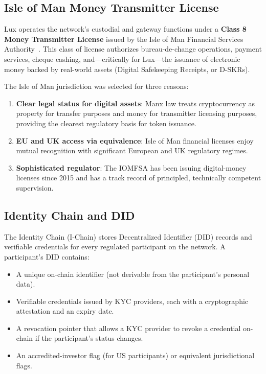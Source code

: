 \documentclass[11pt,a4paper]{article}
\begin{document}
\subsection{Isle of Man Money Transmitter License}

Lux operates the network's custodial and gateway functions under a
\textbf{Class 8 Money Transmitter License} issued by the Isle of Man
Financial Services Authority~\cite{iomfsa,cdax}. This class of
license authorizes bureau-de-change operations, payment services,
cheque cashing, and---critically for Lux---the issuance of
electronic money backed by real-world assets (Digital Safekeeping
Receipts, or D-SKRs).

The Isle of Man jurisdiction was selected for three reasons:

\begin{enumerate}[nosep]
  \item \textbf{Clear legal status for digital assets}: Manx law
        treats cryptocurrency as property for transfer purposes and
        money for transmitter licensing purposes, providing the
        clearest regulatory basis for token issuance.
  \item \textbf{EU and UK access via equivalence}: Isle of Man
        financial licenses enjoy mutual recognition with significant
        European and UK regulatory regimes.
  \item \textbf{Sophisticated regulator}: The IOMFSA has been issuing
        digital-money licenses since 2015 and has a track record of
        principled, technically competent supervision.
\end{enumerate}

\subsection{Identity Chain and DID}

The Identity Chain (I-Chain) stores Decentralized Identifier (DID)
records and verifiable credentials for every regulated participant
on the network. A participant's DID contains:

\begin{itemize}[nosep]
  \item A unique on-chain identifier (not derivable from the
        participant's personal data).
  \item Verifiable credentials issued by KYC providers, each with a
        cryptographic attestation and an expiry date.
  \item A revocation pointer that allows a KYC provider to revoke a
        credential on-chain if the participant's status changes.
  \item An accredited-investor flag (for US participants) or
        equivalent jurisdictional flags.
\end{itemize}
\end{document}
